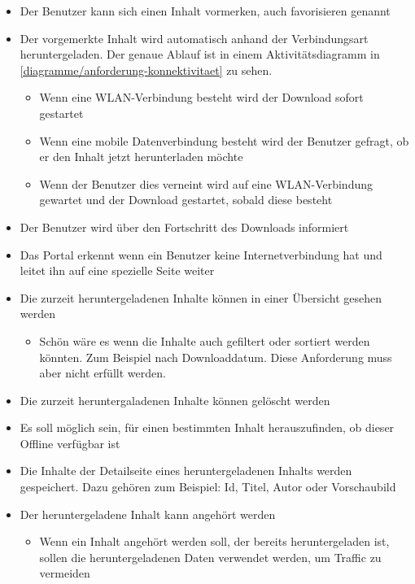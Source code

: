 \begin{itemize}
	\item Der Benutzer kann sich einen Inhalt vormerken, auch favorisieren genannt
	\item Der vorgemerkte Inhalt wird automatisch anhand der Verbindungsart heruntergeladen. Der genaue Ablauf ist in einem Aktivitätsdiagramm in \autoref{diagramme/anforderung-konnektivitaet} zu sehen.
	
	\begin{itemize}
		\item Wenn eine WLAN-Verbindung besteht wird der Download sofort gestartet
		\item Wenn eine mobile Datenverbindung besteht wird der Benutzer gefragt, ob er den Inhalt jetzt herunterladen möchte
		\item Wenn der Benutzer dies verneint wird auf eine WLAN-Verbindung gewartet und der Download gestartet, sobald diese besteht
	\end{itemize}
	

	\item Der Benutzer wird über den Fortschritt des Downloads informiert
	\item Das Portal erkennt wenn ein Benutzer keine Internetverbindung hat und leitet ihn auf eine spezielle Seite weiter
	\item Die zurzeit heruntergeladenen Inhalte können in einer Übersicht gesehen werden
	\begin{itemize}
		\item Schön wäre es wenn die Inhalte auch gefiltert oder sortiert werden könnten. Zum Beispiel nach Downloaddatum. Diese Anforderung muss aber nicht erfüllt werden.
	\end{itemize}
 	\item Die zurzeit heruntergaladenen Inhalte können gelöscht werden
	\item Es soll möglich sein, für einen bestimmten Inhalt herauszufinden, ob dieser Offline verfügbar ist
	\item Die Inhalte der Detailseite eines heruntergeladenen Inhalts werden gespeichert. Dazu gehören zum Beispiel: Id, Titel, Autor oder Vorschaubild
	\item Der heruntergeladene Inhalt kann angehört werden
	\begin{itemize}
		\item Wenn ein Inhalt angehört werden soll, der bereits heruntergeladen ist, sollen die heruntergeladenen Daten verwendet werden, um Traffic zu vermeiden
	\end{itemize}
	
\end{itemize}
